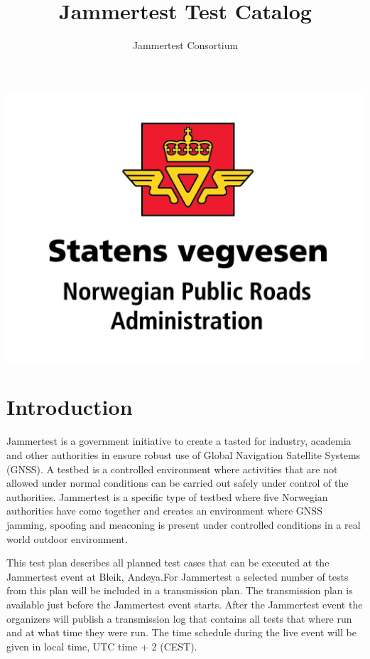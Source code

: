 \documentclass{book}
\title{Jammertest Test Catalog}
\author{Jammertest Consortium}
\date{ }
\begin{document}
\maketitle
\includegraphics[scale=0.1]{graphics/NPRA.png}

\tableofcontents

\section{Introduction}
Jammertest is a government initiative to create a tasted for industry, academia and other authorities in ensure robust use of Global Navigation Satellite Systems (GNSS). A testbed is a controlled environment where activities that are not allowed under normal conditions can be carried out safely under control of the authorities. Jammertest is a specific type of testbed where five Norwegian authorities have come together and creates an environment where GNSS jamming, spoofing and meaconing is present under controlled conditions in a real world outdoor environment.

This test plan describes all planned test cases that can be executed at the Jammertest event at Bleik, Andøya.For Jammertest a selected number of tests from this plan will be included in a transmission plan. The transmission plan is available just before the Jammertest event starts. After the Jammertest event the organizers will publish a transmission log that contains all tests that where run and at what time they were run. The time schedule during the live event will be given in local time, UTC time + 2 (CEST).
\end{document}
